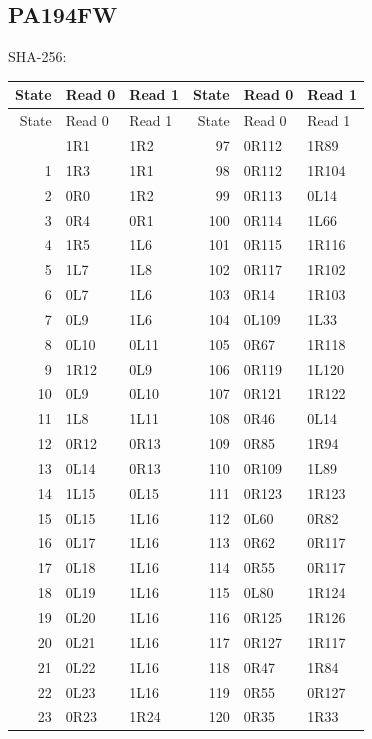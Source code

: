 \clearpage
\subsection{PA194FW}
\noindent\footnotesize SHA-256: \par
\begingroup\small\setlength{\tabcolsep}{12pt}
\begin{longtable}{rll@{\qquad}rll}
\toprule State & Read 0 & Read 1 & State & Read 0 & Read 1\\
\midrule\endfirsthead
\toprule State & Read 0 & Read 1 & State & Read 0 & Read 1\\
\midrule\endhead
\bottomrule\endfoot
0 & 1R1 & 1R2 & 97 & 0R112 & 1R89\\
1 & 1R3 & 1R1 & 98 & 0R112 & 1R104\\
2 & 0R0 & 1R2 & 99 & 0R113 & 0L14\\
3 & 0R4 & 0R1 & 100 & 0R114 & 1L66\\
4 & 1R5 & 1L6 & 101 & 0R115 & 1R116\\
5 & 1L7 & 1L8 & 102 & 0R117 & 1R102\\
6 & 0L7 & 1L6 & 103 & 0R14 & 1R103\\
7 & 0L9 & 1L6 & 104 & 0L109 & 1L33\\
8 & 0L10 & 0L11 & 105 & 0R67 & 1R118\\
9 & 1R12 & 0L9 & 106 & 0R119 & 1L120\\
10 & 0L9 & 0L10 & 107 & 0R121 & 1R122\\
11 & 1L8 & 1L11 & 108 & 0R46 & 0L14\\
12 & 0R12 & 0R13 & 109 & 0R85 & 1R94\\
13 & 0L14 & 0R13 & 110 & 0R109 & 1L89\\
14 & 1L15 & 0L15 & 111 & 0R123 & 1R123\\
15 & 0L15 & 1L16 & 112 & 0L60 & 0R82\\
16 & 0L17 & 1L16 & 113 & 0R62 & 0R117\\
17 & 0L18 & 1L16 & 114 & 0R55 & 0R117\\
18 & 0L19 & 1L16 & 115 & 0L80 & 1R124\\
19 & 0L20 & 1L16 & 116 & 0R125 & 1R126\\
20 & 0L21 & 1L16 & 117 & 0R127 & 1R117\\
21 & 0L22 & 1L16 & 118 & 0R47 & 1R84\\
22 & 0L23 & 1L16 & 119 & 0R55 & 0R127\\
23 & 0R23 & 1R24 & 120 & 0R35 & 1R33\\

\end{longtable}
